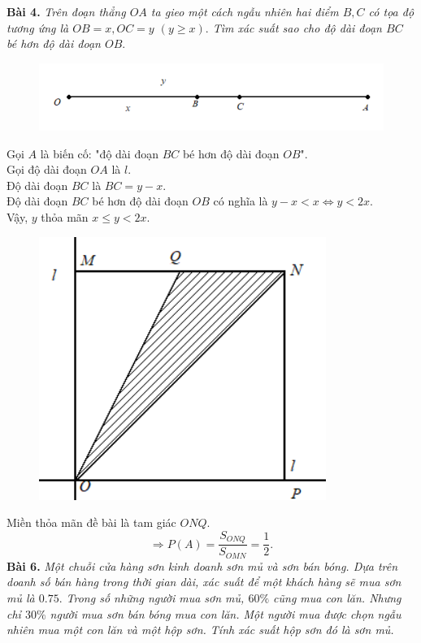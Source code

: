 \documentclass[12pt,a4paper]{article}
\begin{document}
\textbf{Bài 4.} \textit{Trên đoạn thẳng $OA$ ta gieo một cách ngẫu nhiên hai điểm $B, C$ có tọa độ tương ứng là $OB = x, OC = y$ $\left( {y \geqslant x} \right).$ Tìm xác suất sao cho độ dài đoạn $BC$ bé hơn độ dài đoạn $OB.$}\\
\begin{figure}[H]
\begin{center}
\includegraphics[scale=1]{C1_1}
\end{center}
\end{figure}
Gọi $A$ là biến cố: "độ dài đoạn $BC$ bé hơn độ dài đoạn $OB$".\\
Gọi độ dài đoạn $OA$ là $l.$\\
Độ dài đoạn $BC$ là $BC = y - x.$\\
Độ dài đoạn $BC$ bé hơn độ dài đoạn $OB$ có nghĩa là $y - x < x \Leftrightarrow y < 2x.$\\
Vậy, $y$ thỏa mãn $x \leqslant y < 2x.$
\begin{figure}[H]
\begin{center}
\includegraphics[scale=0.8]{C1_2}
\end{center}
\end{figure}
Miền thỏa mãn đề bài là tam giác $ONQ.$
$$ \Rightarrow P\left( A \right) = \frac{{{S_{ONQ}}}}{{{S_{OMN}}}} = \frac{1}{2}.$$
\textbf{Bài 6.} \textit{Một chuỗi cửa hàng sơn kinh doanh sơn mủ và sơn bán bóng. Dựa trên doanh số bán hàng trong thời gian dài, xác suất để một khách hàng sẽ mua sơn mủ là $0.75.$ Trong số những người mua sơn mủ, $60\%$ cũng mua con lăn. Nhưng chỉ $30\%$ người mua sơn bán bóng mua con lăn. Một người mua được chọn ngẫu nhiên mua một con lăn và một hộp sơn. Tính xác suất hộp sơn đó là sơn mủ.}\\
\end{document}
